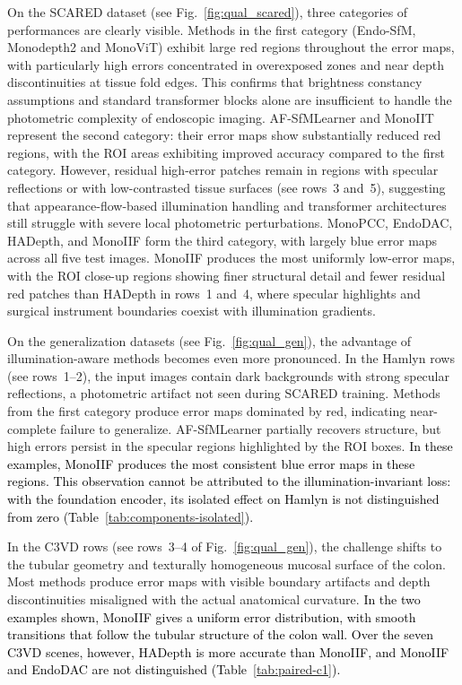 \documentclass[a4paper,fleqn]{cas-dc}
\begin{document}
On the SCARED dataset (see Fig.~\ref{fig:qual_scared}), three categories of performances are clearly visible. 
Methods in the first category (Endo-SfM, Monodepth2 and MonoViT) exhibit large red regions throughout the error maps, with particularly high errors concentrated in overexposed zones and near depth discontinuities 
at tissue fold edges. This confirms that brightness constancy assumptions and standard transformer blocks alone are insufficient to handle the photometric complexity of endoscopic imaging. AF-SfMLearner and MonoIIT represent the second category: their error maps show substantially reduced red regions, with the ROI areas exhibiting improved accuracy compared to the first category. However, residual high-error patches remain in regions with specular reflections or with low-contrasted tissue surfaces (see rows~3 and~5), suggesting that appearance-flow-based illumination handling and transformer architectures still struggle with severe local photometric perturbations. MonoPCC, EndoDAC, HADepth, and MonoIIF form the third category, with largely blue error maps across all five test images. MonoIIF produces the most uniformly low-error maps, with the ROI close-up regions showing finer structural detail and fewer residual red patches than HADepth in rows~1 and~4, where specular highlights and surgical instrument boundaries coexist with illumination gradients.

On the generalization datasets (see Fig.~\ref{fig:qual_gen}), the advantage of illumination-aware methods becomes even more pronounced. In the Hamlyn rows (see rows~1--2), the input images contain dark backgrounds with strong specular reflections, a photometric artifact not seen during SCARED training. Methods from the first category produce error maps dominated by red, indicating near-complete failure to generalize. AF-SfMLearner partially recovers structure, but high errors persist in the specular regions highlighted by the ROI boxes. \textcolor{black}{In these examples, MonoIIF produces the most consistent blue error maps in these regions. This observation cannot be attributed to the illumination-invariant loss: with the foundation encoder, its isolated effect on Hamlyn is not distinguished from zero (Table~\ref{tab:components-isolated}).} 

In the C3VD rows (see rows~3--4 of  Fig.~\ref{fig:qual_gen}), the challenge shifts to the tubular geometry and texturally homogeneous mucosal surface of the colon. Most methods produce error maps with visible boundary artifacts and  depth discontinuities misaligned with the actual anatomical curvature. \textcolor{black}{In the two examples shown, MonoIIF gives a uniform error distribution, with smooth transitions that follow the tubular structure of the colon wall. Over the seven C3VD scenes, however, HADepth is more accurate than MonoIIF, and MonoIIF and EndoDAC are not distinguished (Table~\ref{tab:paired-c1}).}
\end{document}
